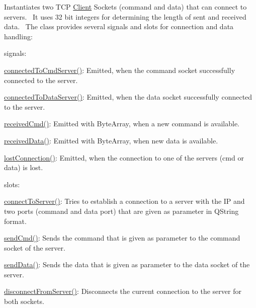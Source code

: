 Instantiates two T\+C\+P \hyperlink{class_client}{Client} Sockets (command and data) that can connect to servers.~\newline
 It uses 32 bit integers for determining the length of sent and received data.~\newline
 The class provides several signals and slots for connection and data handling\+: 
\begin{DoxyItemize}
\item signals\+: 
\begin{DoxyItemize}
\item \hyperlink{class_network_1_1_client_socket_afd964a562ce748dd3669150ee1918845}{connected\+To\+Cmd\+Server()}\+: Emitted, when the command socket successfully connected to the server. 
\item \hyperlink{class_network_1_1_client_socket_a90e3389d37d57852419b188a3b9c5aec}{connected\+To\+Data\+Server()}\+: Emitted, when the data socket successfully connected to the server. 
\item \hyperlink{class_network_1_1_client_socket_af0549e856cdcbc0078253152d7950184}{received\+Cmd()}\+: Emitted with Byte\+Array, when a new command is available. 
\item \hyperlink{class_network_1_1_client_socket_aa724115c563c37501d40948d69449bad}{received\+Data()}\+: Emitted with Byte\+Array, when new data is available. 
\item \hyperlink{class_network_1_1_client_socket_af70f63057d561c78c12d0b0f36408eec}{lost\+Connection()}\+: Emitted, when the connection to one of the servers (cmd or data) is lost. 
\end{DoxyItemize}
\item slots\+: 
\begin{DoxyItemize}
\item \hyperlink{class_network_1_1_client_socket_a07c959b5abad25340d002fe613f626db}{connect\+To\+Server()}\+: Tries to establish a connection to a server with the I\+P and two ports (command and data port) that are given as parameter in Q\+String format. 
\item \hyperlink{class_network_1_1_client_socket_afbed473a7cc51b1a0bf9f89aa3c3d5d4}{send\+Cmd()}\+: Sends the command that is given as parameter to the command socket of the server. 
\item \hyperlink{class_network_1_1_client_socket_a64e2e70099e6deee62c9a55f87309990}{send\+Data()}\+: Sends the data that is given as parameter to the data socket of the server. 
\item \hyperlink{class_network_1_1_client_socket_ae2e573e7eedaab70dfc2678885e8aa1f}{disconnect\+From\+Server()}\+: Disconnects the current connection to the server for both sockets. 
\end{DoxyItemize}
\end{DoxyItemize}

